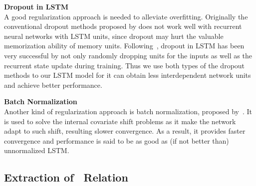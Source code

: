 \noindent
\textbf{Dropout in LSTM}\\
A good regularization approach is needed to alleviate overfitting. Originally the conventional dropout methods proposed by \citeauthor{hinton2012improving} does not work well with recurrent neural networks with LSTM units, since dropout may hurt the valuable memorization ability of memory units. Following~\citeauthor{zaremba2014recurrent}, dropout in LSTM has been very successful by not only randomly dropping units for the inputs as well as the recurrent state update during training. Thus we use both types of the dropout methods to our LSTM model for it can obtain less interdependent network units and achieve better performance.

\noindent \textbf{Batch Normalization}\\
Another kind of regularization approach is batch normalization, proposed by~\citeauthor{ioffe2015batch,cooijmans2016recurrent}. It is used to solve the internal covariate shift problems as it make the network adapt to such shift, resulting slower convergence. As a result, it provides faster convergence and performance is said to be as good as (if not better than) unnormalized LSTM. 

\subsection{Extraction of \lnear\ Relation}
\label{sec:mine}
%
%

